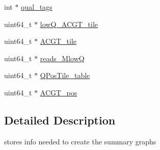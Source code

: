 \begin{DoxyCompactItemize}
\item 
int $\ast$ \hyperlink{structstatsinfo_a2fc7cfbe32bd01653402ff070638292b}{qual\+\_\+tags}
\item 
uint64\+\_\+t $\ast$ \hyperlink{structstatsinfo_ac1a8b88e2e4f486f2767072588adcd2a}{low\+Q\+\_\+\+A\+C\+G\+T\+\_\+tile}
\item 
uint64\+\_\+t $\ast$ \hyperlink{structstatsinfo_aa4987d17317a2d744efaa104f7a3e0b7}{A\+C\+G\+T\+\_\+tile}
\item 
uint64\+\_\+t $\ast$ \hyperlink{structstatsinfo_a9b58ee91e10fa9301a186ca94e68e6fb}{reads\+\_\+\+Mlow\+Q}
\item 
uint64\+\_\+t $\ast$ \hyperlink{structstatsinfo_af2781fc5113bab8c208921a221e2c834}{Q\+Pos\+Tile\+\_\+table}
\item 
uint64\+\_\+t $\ast$ \hyperlink{structstatsinfo_a315b402bd89ea205117d2fab4b26ef10}{A\+C\+G\+T\+\_\+pos}
\end{DoxyCompactItemize}


\subsection{Detailed Description}
stores info needed to create the summary graphs 

